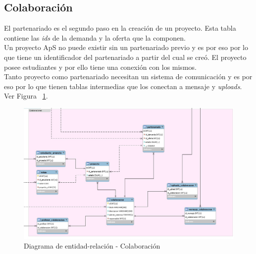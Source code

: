 \documentclass[11pt]{book}
\begin{document}
\subsection{Colaboración}
El partenariado es el segundo paso en la creación de un proyecto. Esta tabla contiene las \textit{ids} de la demanda y la oferta que la componen.\\
Un proyecto ApS no puede existir sin un partenariado previo y es por eso por lo que tiene un identificador del partenariado a partir del cual se creó. El proyecto posee estudiantes y por ello tiene una conexión con los mismos.\\
Tanto proyecto como partenariado necesitan un sistema de comunicación y es por eso por lo que tienen tablas intermedias que los conectan a mensaje y \textit{uploads}. Ver Figura ~\ref{fig:colaboracion}.
\begin{figure}[t]
	\centering
	\includegraphics[scale=0.4]{colaboracion}
	\caption{Diagrama de entidad-relación - Colaboración}
	\label{fig:colaboracion}
\end{figure}
\end{document}
